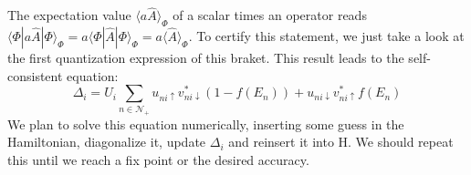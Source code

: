 \documentclass[../main.tex]{subfile}
\begin{document}
The expectation value $\langle a\hat{A}\rangle_{\Phi}$ of a scalar times an operator reads $\langle \Phi|a \hat{A}|\Phi\rangle_{\Phi} = a \langle \Phi|\hat{A}|\Phi\rangle_{\Phi} = a \langle \hat{A}\rangle_{\Phi}$. 
To certify this statement, we just take a look at the first quantization expression of this braket. This result leads to the self-consistent equation:
\begin{equation}\label{eq:SelfConsitentDelta}
    \Delta_i = U_i\sum_{n\in\mathcal{N}_+} u_{ni\uparrow} v_{ni\downarrow}^{\ast} \left(1-f(E_n)\right) + u_{ni\downarrow} v_{ni\uparrow}^{\ast}f(E_n)
\end{equation}
We plan to solve this equation numerically, inserting some guess in the Hamiltonian, diagonalize it, update $\Delta_i$ and reinsert it into H. We should repeat this 
until we reach a fix point or the desired accuracy.\\
\end{document}
